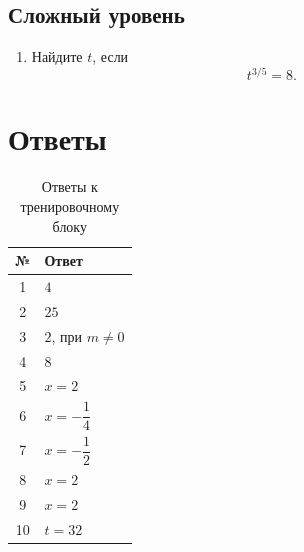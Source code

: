 \documentclass[a4paper,12pt]{article}
\newcommand{\sectionline}{%
    \par\noindent{\color{accent}\rule{\linewidth}{0.7pt}}\par
}
\begin{document}
\subsection*{\color{darkaccent}Сложный уровень}

\begin{enumerate}[resume]
    \item Найдите \(t\), если
    \[
    t^{3/5}=8.
    \]
\end{enumerate}

\clearpage


\section*{\color{darkaccent}Ответы}
\sectionline

\begin{table}[ht]
\centering
\caption{Ответы к тренировочному блоку}
\begin{tabularx}{\linewidth}{@{}cX@{}}
\toprule
\textbf{№} & \textbf{Ответ} \\
\midrule
1 & \(4\) \\

2 & \(25\) \\

3 & \(2\), при \(m\ne0\) \\

4 & \(8\) \\

5 & \(x=2\) \\

6 & \(x=-\dfrac14\) \\

7 & \(x=-\dfrac12\) \\

8 & \(x=2\) \\

9 & \(x=2\) \\

10 & \(t=32\) \\
\bottomrule
\end{tabularx}
\end{table}

\vfill
\end{document}
